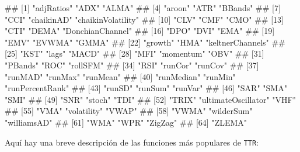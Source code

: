 \documentclass[
]{book}
\newenvironment{Shaded}{\begin{snugshade}}{\end{snugshade}}
\newcommand{\FunctionTok}[1]{\textcolor[rgb]{0.13,0.29,0.53}{\textbf{#1}}}
\newcommand{\NormalTok}[1]{#1}
\newcommand{\SpecialCharTok}[1]{\textcolor[rgb]{0.81,0.36,0.00}{\textbf{#1}}}
\begin{document}
\begin{Shaded}
\end{Shaded}

\begin{Shaded}
\begin{Highlighting}[]
\NormalTok{\#\#  [1] "adjRatios"          "ADX"                "ALMA"              }
\NormalTok{\#\#  [4] "aroon"              "ATR"                "BBands"            }
\NormalTok{\#\#  [7] "CCI"                "chaikinAD"          "chaikinVolatility" }
\NormalTok{\#\# [10] "CLV"                "CMF"                "CMO"               }
\NormalTok{\#\# [13] "CTI"                "DEMA"               "DonchianChannel"   }
\NormalTok{\#\# [16] "DPO"                "DVI"                "EMA"               }
\NormalTok{\#\# [19] "EMV"                "EVWMA"              "GMMA"              }
\NormalTok{\#\# [22] "growth"             "HMA"                "keltnerChannels"   }
\NormalTok{\#\# [25] "KST"                "lags"               "MACD"              }
\NormalTok{\#\# [28] "MFI"                "momentum"           "OBV"               }
\NormalTok{\#\# [31] "PBands"             "ROC"                "rollSFM"           }
\NormalTok{\#\# [34] "RSI"                "runCor"             "runCov"            }
\NormalTok{\#\# [37] "runMAD"             "runMax"             "runMean"           }
\NormalTok{\#\# [40] "runMedian"          "runMin"             "runPercentRank"    }
\NormalTok{\#\# [43] "runSD"              "runSum"             "runVar"            }
\NormalTok{\#\# [46] "SAR"                "SMA"                "SMI"               }
\NormalTok{\#\# [49] "SNR"                "stoch"              "TDI"               }
\NormalTok{\#\# [52] "TRIX"               "ultimateOscillator" "VHF"               }
\NormalTok{\#\# [55] "VMA"                "volatility"         "VWAP"              }
\NormalTok{\#\# [58] "VWMA"               "wilderSum"          "williamsAD"        }
\NormalTok{\#\# [61] "WMA"                "WPR"                "ZigZag"            }
\NormalTok{\#\# [64] "ZLEMA"}
\end{Highlighting}
\end{Shaded}

Aquí hay una breve descripción de las funciones más populares de \texttt{TTR}:
\end{document}
